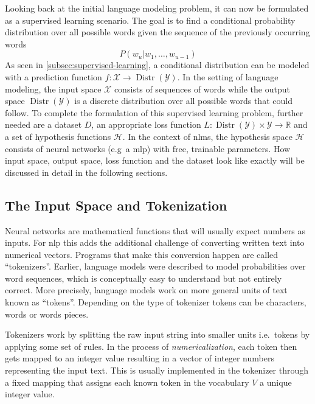 Looking back at the initial language modeling problem, it can now be formulated as a supervised learning scenario.
The goal is to find a conditional probability distribution over all possible words given the sequence of the previously occurring words
\[
    P(w_u | w_1, \dots , w_{u-1})
\]
As seen in \autoref{subsec:supervised-learning}, a conditional distribution can be modeled with a prediction function $f: \mathcal{X} \rightarrow \operatorname{Distr}(\mathcal{Y})$.
In the setting of language modeling, the input space $\mathcal{X}$ consists of sequences of words while the output space $\operatorname{Distr}(\mathcal{Y})$ is a discrete distribution over all possible words that could follow.
To complete the formulation of this supervised learning problem, further needed are a dataset $D$, an appropriate loss function $L: \operatorname{Distr}(\mathcal{Y}) \times \mathcal{Y} \rightarrow \mathbb{R}$ and a set of hypothesis functions $\mathcal{H}$.
In the context of \acrlong{nlm}s, the hypothesis space $\mathcal{H}$ consists of neural networks (e.g\ a \gls{mlp}) with free, trainable parameters.
How input space, output space, loss function and the dataset look like exactly will be discussed in detail in the following sections.



\subsection{The Input Space and Tokenization}\label{subsec:tokenization}
Neural networks are mathematical functions that will usually expect numbers as inputs.
For \gls{nlp} this adds the additional challenge of converting written text into numerical vectors.
Programs that make this conversion happen are called \enquote{tokenizers}.
Earlier, language models were described to model probabilities over word sequences, which is conceptually easy to understand but not entirely correct.
More precisely, language models work on more general units of text known as \enquote{tokens}.
Depending on the type of tokenizer tokens can be characters, words or words pieces.

Tokenizers work by splitting the raw input string into smaller units i.e.\ tokens by applying some set of rules.
In the process of \textit{numericalization}, each token then gets mapped to an integer value resulting in a vector of integer numbers representing the input text.
This is usually implemented in the tokenizer through a fixed mapping that assigns each known token in the vocabulary $V$ a unique integer value.


